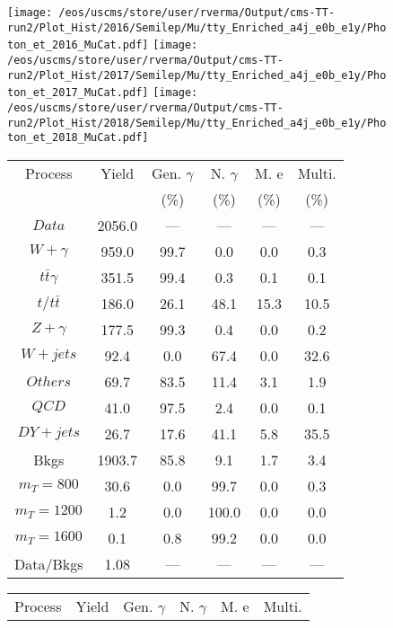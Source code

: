 \begin{figure}
\centering
\texttt{[image: /eos/uscms/store/user/rverma/Output/cms-TT-run2/Plot\_Hist/2016/Semilep/Mu/tty\_Enriched\_a4j\_e0b\_e1y/Photon\_et\_2016\_MuCat.pdf]}
\texttt{[image: /eos/uscms/store/user/rverma/Output/cms-TT-run2/Plot\_Hist/2017/Semilep/Mu/tty\_Enriched\_a4j\_e0b\_e1y/Photon\_et\_2017\_MuCat.pdf]}
\texttt{[image: /eos/uscms/store/user/rverma/Output/cms-TT-run2/Plot\_Hist/2018/Semilep/Mu/tty\_Enriched\_a4j\_e0b\_e1y/Photon\_et\_2018\_MuCat.pdf]}
\begin{minipage}[c]{0.32\textwidth}
\centering
\tiny{
\begin{tabular}{cccccc}
\hline
Process & Yield & Gen. $\gamma$ & N. $\gamma$ & M. e & Multi. \\
 &  & (\%) & (\%) & (\%) & (\%)  \\
\hline
                                                                      $ Data $ &  2056.0 &  --- &  --- &  --- &  ---\\
$ W+\gamma $ &  959.0 &  99.7 &  0.0 &  0.0 &  0.3\\
$ t\bar{t}\gamma $ &  351.5 &  99.4 &  0.3 &  0.1 &  0.1\\
$ t/t\bar{t} $ &  186.0 &  26.1 &  48.1 &  15.3 &  10.5\\
$ Z+\gamma $ &  177.5 &  99.3 &  0.4 &  0.0 &  0.2\\
$ W+jets $ &  92.4 &  0.0 &  67.4 &  0.0 &  32.6\\
$ Others $ &  69.7 &  83.5 &  11.4 &  3.1 &  1.9\\
$ QCD $ &  41.0 &  97.5 &  2.4 &  0.0 &  0.1\\
$ DY+jets $ &  26.7 &  17.6 &  41.1 &  5.8 &  35.5\\
Bkgs &  1903.7 &  85.8 &  9.1 &  1.7 &  3.4\\
$ m_{T} = 800 $ &  30.6 &  0.0 &  99.7 &  0.0 &  0.3\\
$ m_{T} = 1200 $ &  1.2 &  0.0 &  100.0 &  0.0 &  0.0\\
$ m_{T} = 1600 $ &  0.1 &  0.8 &  99.2 &  0.0 &  0.0\\
Data/Bkgs &  1.08 &  --- &  --- &  --- &  ---\\
\hline
\end{tabular}
}
\end{minipage}
\begin{minipage}[c]{0.32\textwidth}
\centering
\tiny{
\begin{tabular}{cccccc}
\hline
Process & Yield & Gen. $\gamma$ & N. $\gamma$ & M. e & Multi. \\

\end{tabular}}
\end{minipage}
\end{figure}
